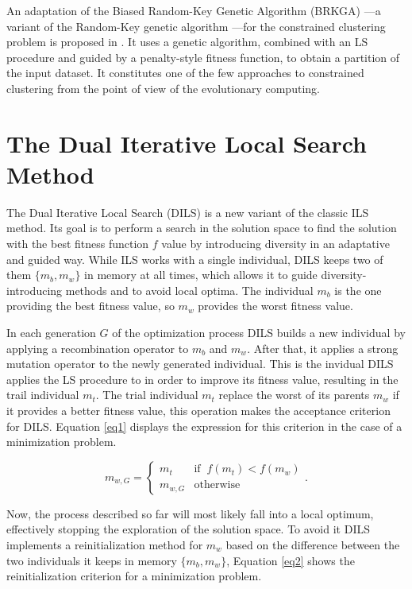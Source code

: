 \documentclass[review]{elsarticle}
\begin{document}
An adaptation of the Biased Random-Key Genetic Algorithm (BRKGA) \cite{gonccalves2011biased}---a variant of the Random-Key genetic algorithm \cite{bean1994genetic}---for the constrained clustering problem is proposed in \cite{de2017comparison}. It uses a genetic algorithm, combined with an LS procedure and guided by a penalty-style fitness function, to obtain a partition of the input dataset. It constitutes one of the few approaches to constrained clustering from the point of view of the evolutionary computing.

\clearpage 

\section{The Dual Iterative Local Search Method} \label{sec:DILS}

The Dual Iterative Local Search (DILS) is a new variant of the classic ILS method. Its goal is to perform a search in the solution space to find the solution with the best fitness function $f$ value by introducing diversity in an adaptative and guided way. While ILS works with a single individual, DILS keeps two of them $\{m_b, m_w\}$ in memory at all times, which allows it to guide diversity-introducing methods and to avoid local optima. The individual $m_b$ is the one providing the best fitness value, so $m_w$ provides the worst fitness value.

In each generation $G$ of the optimization process DILS builds a new individual by applying a recombination operator to $m_b$ and $m_w$. After that, it applies a strong mutation operator to the newly generated individual. This is the invidual DILS applies the LS procedure to in order to improve its fitness value, resulting in the trail individual $m_t$. The trial individual $m_t$ replace the worst of its parents $m_w$ if it provides a better fitness value, this operation makes the acceptance criterion for DILS. Equation \ref{eq1} displays the expression for this criterion in the case of a minimization problem.

\begin{equation}
m_{w,G} = \left\{ \begin{array}{lc}
m_t &   \text{if} \;\; f(m_t) < f(m_w)\\
m_{w,G} &  \text{otherwise}
\end{array}
\right..
\label{eq1}
\end{equation}

Now, the process described so far will most likely fall into a local optimum, effectively stopping the exploration of the solution space. To avoid it DILS implements a reinitialization method for $m_w$ based on the difference between the two individuals it keeps in memory $\{m_b, m_w\}$, Equation \ref{eq2} shows the reinitialization criterion for a minimization problem.
\end{document}
